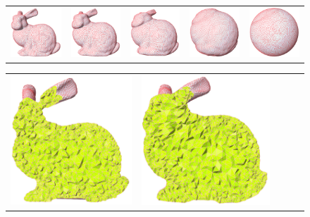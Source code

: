 \documentclass[runningheads]{llncs}
\begin{document}
{ \setlength{\tabcolsep}{0pt}
\begin{figure}[!htbp]
\centering
\begin{tabular}{ccccc}
\includegraphics[height=0.2\textwidth]{./figs/bunny_omt_morph/a.png}&
\includegraphics[height=0.2\textwidth]{./figs/bunny_omt_morph/b.png}&
\includegraphics[height=0.2\textwidth]{./figs/bunny_omt_morph/c.png}&
\includegraphics[height=0.2\textwidth]{./figs/bunny_omt_morph/d.png}&
\includegraphics[height=0.2\textwidth]{./figs/bunny_omt_morph/e.png}\\
\end{tabular}
\begin{tabular}{ccccc}
\includegraphics[height=0.2\textwidth]{./figs/bunny_omt_morph/f.png}&
\includegraphics[height=0.2\textwidth]{./figs/bunny_omt_morph/g.png}&

\end{tabular}
\end{figure}}
\end{document}
